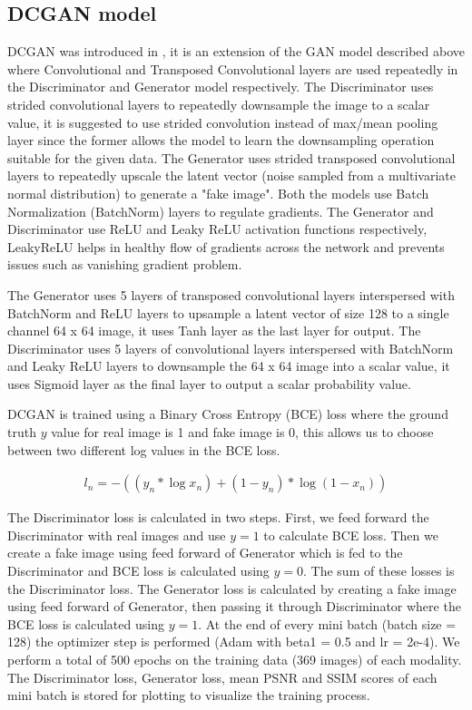 \documentclass[10pt,journal,compsoc]{IEEEtran}
\begin{document}
\pagebreak

\subsection{DCGAN model}

DCGAN was introduced in \cite{Radford2015}, it is an extension of the GAN model described above where Convolutional and Transposed Convolutional layers are used repeatedly
in the Discriminator and Generator model respectively. The Discriminator uses strided convolutional layers to repeatedly downsample the image to a scalar value, it is
suggested to use strided convolution instead of max/mean pooling layer since the former allows the model to learn the downsampling operation suitable for the given data.
The Generator uses strided transposed convolutional layers to repeatedly upscale the latent vector (noise sampled from a multivariate normal distribution) to generate a
"fake image". Both the models use Batch Normalization (BatchNorm) layers to regulate gradients. The Generator and Discriminator use ReLU and Leaky ReLU activation functions
respectively, LeakyReLU helps in healthy flow of gradients across the network and prevents issues such as vanishing gradient problem.

The Generator uses 5 layers of transposed convolutional layers interspersed with BatchNorm and ReLU layers to upsample a latent vector of size 128 to a single channel
64 x 64 image, it uses Tanh layer as the last layer for output. The Discriminator uses 5 layers of convolutional layers interspersed with BatchNorm and Leaky ReLU layers to
downsample the 64 x 64 image into a scalar value, it uses Sigmoid layer as the final layer to output a scalar probability value.

DCGAN is trained using a Binary Cross Entropy (BCE) loss where the ground truth $y$ value for real image is 1 and fake image is 0, this allows us to choose between two different log values in the BCE loss.

\begin{align}
  l_n = - ((y_n * \log x_n) + (1 - y_n) * \log (1 - x_n))
\end{align}

The Discriminator loss is calculated in two steps. First, we feed forward the Discriminator with real images and use $y = 1$ to calculate BCE loss. Then we create a fake
image using feed forward of Generator which is fed to the Discriminator and BCE loss is calculated using $y = 0$. The sum of these losses is the Discriminator loss.
The Generator loss is calculated by creating a fake image using feed forward of Generator, then passing it through Discriminator where the BCE loss is calculated using
$y = 1$. At the end of every mini batch (batch size = 128) the optimizer step is performed (Adam with beta1 = 0.5 and lr = 2e-4). We perform a total of 500 epochs on the training data (369 images) of each modality. The Discriminator loss, Generator loss, mean PSNR and SSIM scores of each mini batch is stored for plotting to visualize the
training process.
\end{document}
